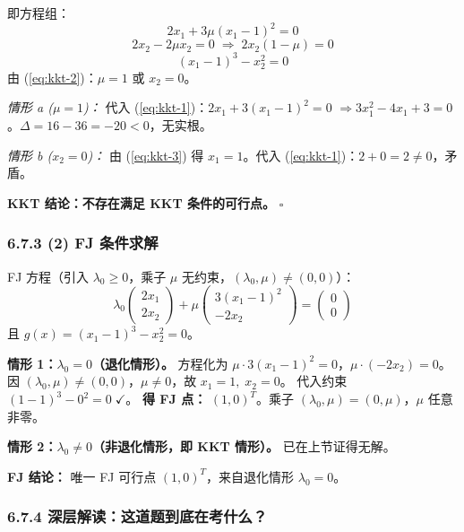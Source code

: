 即方程组：
\begin{equation}
2x_1 + 3\mu(x_1-1)^2 = 0 \label{eq:kkt-1}
\end{equation}
\begin{equation}
2x_2 - 2\mu x_2 = 0 \;\Rightarrow\; 2x_2(1-\mu) = 0 \label{eq:kkt-2}
\end{equation}
\begin{equation}
(x_1-1)^3 - x_2^2 = 0 \label{eq:kkt-3}
\end{equation}
由 (\ref{eq:kkt-2})：$\mu=1$ 或 $x_2=0$。

\smallskip
\textit{情形 a ($\mu=1$)：} 代入 (\ref{eq:kkt-1})：$2x_1+3(x_1-1)^2=0$
$\Rightarrow 3x_1^2-4x_1+3=0$。$\Delta=16-36=-20<0$，无实根。

\textit{情形 b ($x_2=0$)：} 由 (\ref{eq:kkt-3}) 得 $x_1=1$。代入 (\ref{eq:kkt-1})：$2+0=2\neq 0$，矛盾。

\smallskip
\textbf{KKT 结论：不存在满足 KKT 条件的可行点。} $\square$

\subsubsection{6.7.3 (2) FJ 条件求解}

FJ 方程（引入 $\lambda_0\ge0$，乘子 $\mu$ 无约束，$(\lambda_0,\mu)\neq(0,0)$）：
\[
\lambda_0 \begin{pmatrix} 2x_1 \\ 2x_2 \end{pmatrix}
+ \mu \begin{pmatrix} 3(x_1-1)^2 \\ -2x_2 \end{pmatrix}
= \begin{pmatrix} 0 \\ 0 \end{pmatrix}
\]
且 $g(x)=(x_1-1)^3-x_2^2=0$。

\smallskip
\textbf{情形 1：$\lambda_0 = 0$（退化情形）。}
方程化为 $\mu\cdot 3(x_1-1)^2 = 0$，$\mu\cdot(-2x_2)=0$。
因 $(\lambda_0,\mu)\neq(0,0)$，$\mu\neq 0$，故 $x_1=1,\;x_2=0$。
代入约束 $(1-1)^3-0^2=0\;\checkmark$。
\textbf{得 FJ 点：} $(1,0)^T$。乘子 $(\lambda_0,\mu)=(0,\mu)$，$\mu$ 任意非零。

\smallskip
\textbf{情形 2：$\lambda_0 \neq 0$（非退化情形，即 KKT 情形）。}
已在上节证得无解。

\smallskip
\textbf{FJ 结论：} 唯一 FJ 可行点 $(1,0)^T$，来自退化情形 $\lambda_0=0$。

\subsubsection{6.7.4 深层解读：这道题到底在考什么？}

